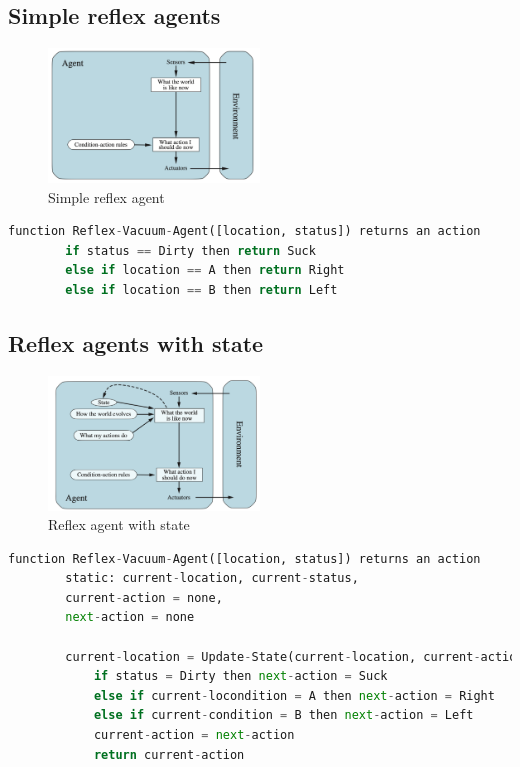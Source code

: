 \subsection{Simple reflex agents}
\begin{figure}[H]
    \centering
    \includegraphics[width=0.5\textwidth]{img/reflex-agents.png}
    \caption{Simple reflex agent}
    \label{fig:simple_reflex_agent}
\end{figure}
\begin{lstlisting}[language=Python, basicstyle=\small]
    function Reflex-Vacuum-Agent([location, status]) returns an action
        if status == Dirty then return Suck
        else if location == A then return Right
        else if location == B then return Left
\end{lstlisting}
\subsection{Reflex agents with state}
\begin{figure}[H]
    \centering
    \includegraphics[width=0.5\textwidth]{img/reflex-agents-with-state.png}
    \caption{Reflex agent with state}
    \label{fig:reflex_agent_with_state}
\end{figure}
\begin{lstlisting}[language=Python, basicstyle=\small]
    function Reflex-Vacuum-Agent([location, status]) returns an action
        static: current-location, current-status,
        current-action = none,
        next-action = none
        
        current-location = Update-State(current-location, current-action)
            if status = Dirty then next-action = Suck
            else if current-locondition = A then next-action = Right
            else if current-condition = B then next-action = Left
            current-action = next-action
            return current-action
\end{lstlisting}
